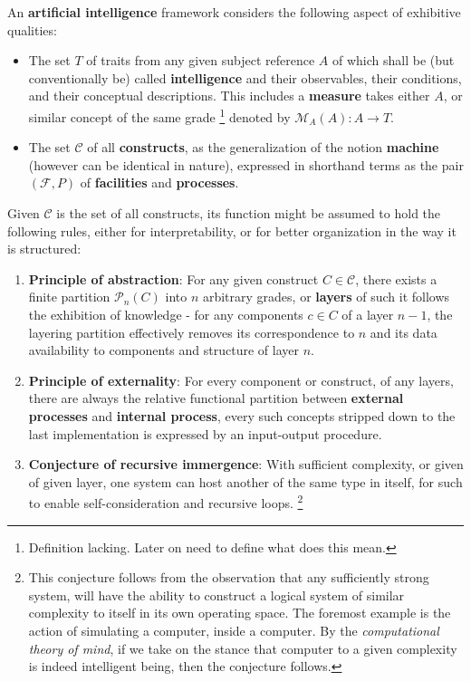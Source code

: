 \begin{conjecture}\label{conj:Artificial_FrameWork}
    An \textbf{artificial intelligence} framework considers the following aspect of exhibitive qualities:
    \begin{itemize}[itemsep=1pt,topsep=1pt]
        \item The set $T$ of traits from any given subject reference $A$ of which shall be (but conventionally be) called \textbf{intelligence} and their observables, their conditions, and their conceptual descriptions. This includes a \textbf{measure} takes either $A$, or similar concept of the same grade \footnote{Definition lacking. Later on need to define what does this mean.} denoted by $\mathcal{M}_{A}(A): A\to T$.
        \item The set $\mathcal{C}$ of all \textbf{constructs}, as the generalization of the notion \textbf{machine} (however can be identical in nature), expressed in shorthand terms as the pair $(\mathcal{F},P)$ of \textbf{facilities} and \textbf{processes}. 
    \end{itemize}
    Given $\mathcal{C}$ is the set of all constructs, its function might be assumed to hold the following rules, either for interpretability, or for better organization in the way it is structured: 
    \begin{enumerate}[itemsep=1pt,topsep=1pt]
        \item \textbf{Principle of abstraction}: For any given construct $C\in \mathcal{C}$, there exists a finite partition $\mathcal{P}_{n}(C)$ into $n$ arbitrary grades, or \textbf{layers} of such it follows the exhibition of knowledge - for any components $c\in C$ of a layer $n-1$, the layering partition effectively removes its correspondence to $n$ and its data availability to components and structure of layer $n$.
        \item \textbf{Principle of externality}: For every component or construct, of any layers, there are always the relative functional partition between \textbf{external processes} and \textbf{internal process}, every such concepts stripped down to the last implementation is expressed by an input-output procedure.  
        \item \textbf{Conjecture of recursive immergence}: With sufficient complexity, or given of given layer, one system can host another of the same type in itself, for such to enable self-consideration and recursive loops. \footnote{This conjecture follows from the observation that any sufficiently strong system, will have the ability to construct a logical system of similar complexity to itself in its own operating space. The foremost example is the action of simulating a computer, inside a computer. By the \textit{computational theory of mind}, if we take on the stance that computer to a given complexity is indeed intelligent being, then the conjecture follows.}

\end{enumerate}
\end{conjecture}

